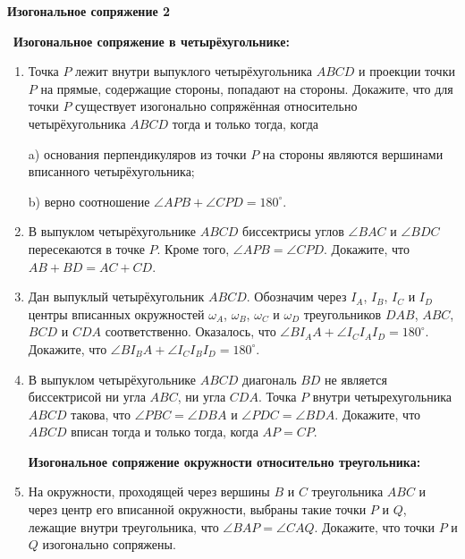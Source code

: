 \documentclass{article}
\begin{document}
\large



\begin{center}
\textbf{Изогональное сопряжение 2}
\end{center}


$\,$ \textbf{Изогональное сопряжение в четырёхугольнике:}

\begin{enumerate}[label*=\protect\fbox{\arabic{enumi}}]

\item Точка $P$ лежит внутри выпуклого четырёхугольника $ABCD$ и проекции точки $P$ на прямые, содержащие стороны, попадают на стороны. Докажите, что для точки $P$ существует изогонально сопряжённая относительно четырёхугольника $ABCD$ тогда и только тогда, когда

a) основания перпендикуляров из точки $P$ на стороны являются вершинами вписанного четырёхугольника;

b) верно соотношение $\angle APB+\angle CPD=180^\circ$.

\item  В выпуклом четырёхугольнике \(ABCD\) биссектрисы углов \(\angle BAC\) и \(\angle BDC\) пересекаются в точке \(P\). Кроме того, \(\angle APB = \angle CPD\). Докажите, что \(AB + BD = AC + CD\).

\item  Дан выпуклый четырёхугольник \(ABCD\). Обозначим через \(I_A\), \(I_B\), \(I_C\) и \(I_D\) центры вписанных окружностей \(\omega_A\), \(\omega_B\), \(\omega_C\) и \(\omega_D\) треугольников \(DAB\), \(ABC\), \(BCD\) и \(CDA\) соответственно. Оказалось, что \(\angle BI_AA + \angle I_CI_AI_D = 180^\circ\). Докажите, что \(\angle BI_BA + \angle I_CI_BI_D = 180^\circ\).

\item  В выпуклом четырёхугольнике \(ABCD\) диагональ \(BD\) не является биссектрисой ни угла \(ABC\), ни угла \(CDA\). Точка \(P\) внутри четырехугольника \(ABCD\) такова, что \(\angle PBC = \angle DBA\) и \(\angle PDC = \angle BDA\). Докажите, что \(ABCD\) вписан тогда и только тогда, когда \(AP = CP\).

\textbf{Изогональное сопряжение окружности относительно треугольника:}

\item  На окружности, проходящей через вершины \(B\) и \(C\) треугольника \(ABC\) и через центр его вписанной окружности, выбраны такие точки \(P\) и \(Q\), лежащие внутри треугольника, что \(\angle BAP = \angle CAQ\). Докажите, что точки \(P\) и \(Q\) изогонально сопряжены.


\end{enumerate}
\end{document}
